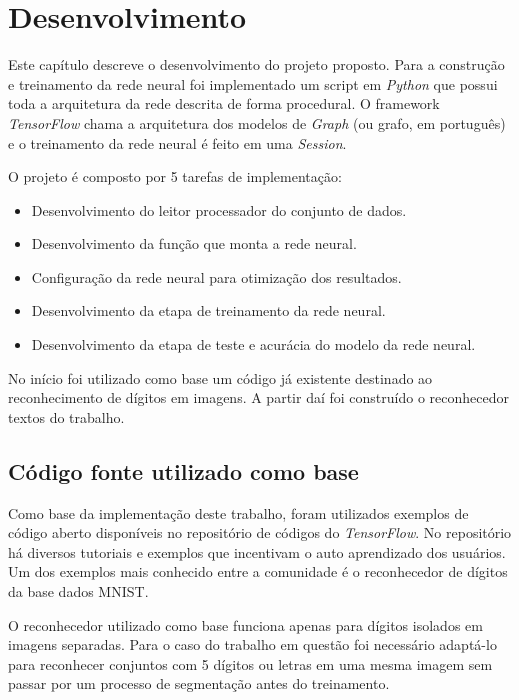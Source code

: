 \chapter{Desenvolvimento}

Este capítulo descreve o desenvolvimento do projeto proposto. 
Para a construção e treinamento da rede neural foi implementado um
script em \textit{Python} que possui toda a arquitetura da rede
descrita de forma procedural. O framework \textit{TensorFlow} chama a
arquitetura dos modelos de \textit{Graph} (ou grafo, em português) e o
treinamento da rede neural é feito em uma \textit{Session}.

O projeto é composto por 5 tarefas de implementação: 

\begin{itemize}

\item Desenvolvimento do leitor processador do conjunto de dados.

\item Desenvolvimento da função que monta a rede neural.

\item Configuração da rede neural para otimização dos resultados.

\item Desenvolvimento da etapa de treinamento da rede neural.

\item Desenvolvimento da etapa de teste e acurácia do modelo da rede
  neural.

\end{itemize}

No início foi utilizado como base um código já existente destinado ao
reconhecimento de dígitos em imagens. A partir daí foi construído o
reconhecedor textos do trabalho.

\section{Código fonte utilizado como base} \label{codigoBase}

Como base da implementação deste trabalho, foram utilizados exemplos
de código aberto disponíveis no repositório de códigos do
\textit{TensorFlow}\cite{tensorCode}. No repositório há diversos
tutoriais e exemplos que incentivam o auto aprendizado dos
usuários. Um dos exemplos mais conhecido entre a comunidade é o
reconhecedor de dígitos da base dados MNIST\cite{mnist}.

O reconhecedor utilizado como base funciona apenas para dígitos
isolados em imagens separadas. Para o caso do trabalho em questão
foi necessário adaptá-lo para reconhecer conjuntos com 5 dígitos ou
letras em uma mesma imagem sem passar por um processo de segmentação
antes do treinamento.

